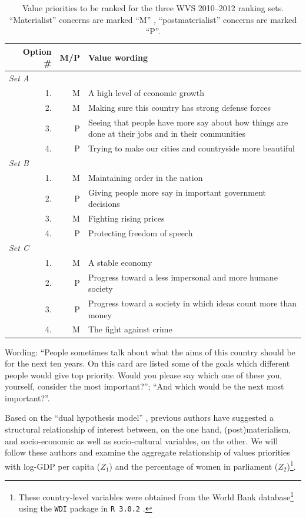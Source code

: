 \documentclass[letterpaper,12pt]{article}
\begin{document}
\begin{table}
\label{sec:data}\begin{small}
\caption{\label{tab:ranking-question}
Value priorities to be ranked for the three WVS 2010--2012 ranking sets. ``Materialist'' concerns are marked ``M'' , ``postmaterialist'' concerns are marked ``P''.
}
\begin{tabular}{p{}rrp{}}
\hline
& Option \# &M/P& Value wording\\
\hline
\multicolumn{3}{l}{\emph{Set A}}\\
&1. & M &A high level of economic growth\\
&2. & M &Making sure this country has strong defense forces \\
&3. & P &Seeing that people have more say about how things are done at their jobs and in their communities\\
&4. & P &Trying to make our cities and countryside more beautiful\\

\multicolumn{3}{l}{\emph{Set B}}\\
&1. & M &	Maintaining order in the nation\\
&2. & P &Giving people more say in important government decisions \\
&3. & M &	Fighting rising prices\\
&4. & P &Protecting freedom of speech\\

\multicolumn{3}{l}{\emph{Set C}}\\
&1. & M &	A stable economy\\
&2. & P &Progress toward a less impersonal and more humane society \\
&3. & P &	Progress toward a society in which ideas count more than money \\
&4. & M &	The fight against crime\\
\hline
	\end{tabular}
Wording: ``People sometimes talk about what the aims of this country should be for the next ten years. On this card are listed some of the goals which different people would give top priority. Would you please say which one of these you, yourself, consider the most important?''; ``And which would be the next most important?''.

	\end{small}
\end{table}



Based on the ``dual hypothesis model'' \citep[p. 881]{inglehart1981post}, previous authors have suggested a structural relationship of interest between, on the one hand, (post)materialism, and socio-economic \citep{inglehart2010changing} as well as socio-cultural \citep{inglehart2002gender} variables, on the other.
We will follow these authors and examine the aggregate relationship of values priorities with log-GDP per capita ($Z_1$) and the percentage of women in parliament ($Z_2$)\footnote{These country-level variables were obtained from the World Bank database\footnote{\url{http://data.worldbank.org/}} using the \texttt{WDI} package \citep{arel2013WDI} in \texttt{R 3.0.2} \citep{Rlanguage}.
}. 
\end{document}
